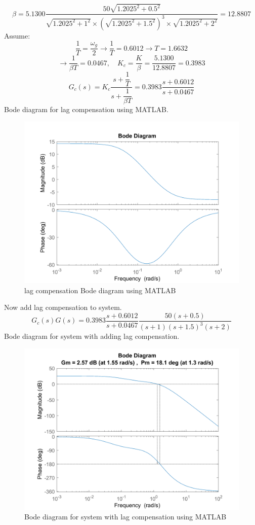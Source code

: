 $$
\beta = 5.1300\dfrac{50\sqrt{1.2025^2+0.5^2}}{\sqrt{1.2025^2+1^2}\times(\sqrt{1.2025^2 + 1.5^2})^3\times\sqrt{1.2025^2 + 2^2}} = 12.8807
$$
Assume:
$$
\dfrac{1}{T} = \dfrac{\omega_g}{2} 
\to \dfrac{1}{T}  = 0.6012 \to T = 1.6632
$$
$$
\to \dfrac{1}{\beta T} = 0.0467, \quad K_c = \dfrac{K}{\beta} = \dfrac{5.1300}{12.8807} = 0.3983
$$
$$
G_c(s) = K_c \dfrac{s + \dfrac{1}{T}}{s + \dfrac{1}{\beta T}}
= 0.3983 \dfrac{s + 0.6012}{s + 0.0467}
$$
Bode diagram for lag compensation using MATLAB.
\begin{figure}[H]
	\caption{lag compensation Bode diagram using MATLAB}
	\centering
	\includegraphics[width=12cm]{../Figure/Q1/b/controller.png}
\end{figure}
Now add lag compensation to system.
$$
G_c(s)G(s) = 0.3983 \dfrac{s + 0.6012}{s + 0.0467}\dfrac{50(s+0.5)}{(s+1)(s+1.5)^{3}(s+2)}
$$
Bode diagram for system with adding lag compensation.
\begin{figure}[H]
	\caption{Bode diagram for system with lag compensation using MATLAB}
	\centering
	\includegraphics[width=12cm]{../Figure/Q1/b/new_margin.png}
\end{figure}
